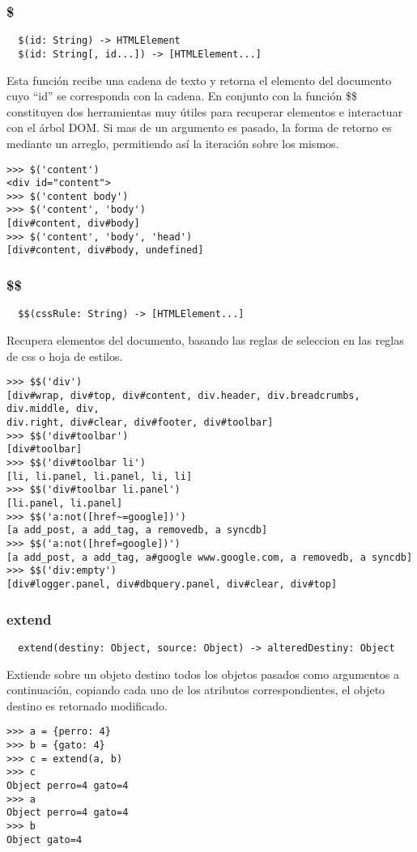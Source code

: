 \subsubsection*{\$}
\begin{verbatim}
  $(id: String) -> HTMLElement
  $(id: String[, id...]) -> [HTMLElement...]
\end{verbatim}
Esta función recibe una cadena de texto y retorna el elemento del documento
cuyo ``id'' se corresponda con la cadena. En conjunto con la función \$\$
constituyen dos herramientas muy útiles para recuperar elementos e interactuar
con el árbol DOM. Si mas de un argumento es pasado, la forma de retorno es
mediante un arreglo, permitiendo así la iteración sobre los mismos.
\begin{lstlisting}[style=consola]
>>> $('content')
<div id="content">
>>> $('content body')
>>> $('content', 'body')
[div#content, div#body]
>>> $('content', 'body', 'head')
[div#content, div#body, undefined]
\end{lstlisting}

\subsubsection*{\$\$}
\begin{verbatim}
  $$(cssRule: String) -> [HTMLElement...]
\end{verbatim}
Recupera elementos del documento, basando las reglas de seleccion en las
reglas de css o hoja de estilos.
\begin{lstlisting}[style=consola] >>> $$('div')
[div#wrap, div#top, div#content, div.header, div.breadcrumbs, div.middle, div,
div.right, div#clear, div#footer, div#toolbar]
>>> $$('div#toolbar')
[div#toolbar]
>>> $$('div#toolbar li')
[li, li.panel, li.panel, li, li]
>>> $$('div#toolbar li.panel')
[li.panel, li.panel]
>>> $$('a:not([href~=google])')
[a add_post, a add_tag, a removedb, a syncdb]
>>> $$('a:not([href=google])')
[a add_post, a add_tag, a#google www.google.com, a removedb, a syncdb]
>>> $$('div:empty')
[div#logger.panel, div#dbquery.panel, div#clear, div#top]
\end{lstlisting}

\subsubsection*{extend}
\begin{verbatim}
  extend(destiny: Object, source: Object) -> alteredDestiny: Object
\end{verbatim}
Extiende sobre un objeto destino todos los objetos pasados como argumentos a
continuación, copiando cada uno de los atributos correspondientes, el objeto
destino es retornado modificado.
\begin{lstlisting}[style=consola]
>>> a = {perro: 4}
>>> b = {gato: 4}
>>> c = extend(a, b)
>>> c
Object perro=4 gato=4
>>> a
Object perro=4 gato=4
>>> b
Object gato=4
\end{lstlisting}

